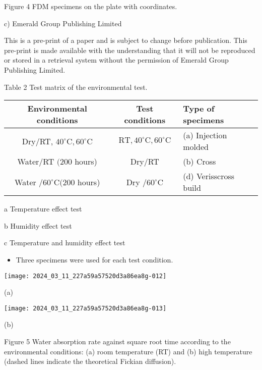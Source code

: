 \documentclass[10pt]{article}
\begin{document}
Figure 4 FDM specimens on the plate with coordinates.

c) Emerald Group Publishing Limited

This is a pre-print of a paper and is subject to change before publication. This pre-print is made available with the understanding that it will not be reproduced or stored in a retrieval system without the permission of Emerald Group Publishing Limited.

Table 2 Test matrix of the environmental test.

\begin{center}
\begin{tabular}{ccl}
\hline
Environmental conditions & Test conditions & Type of specimens \\
\hline
Dry/RT, $40^{\circ} \mathrm{C}, 60^{\circ} \mathrm{C}$ & $\mathrm{RT}, 40^{\circ} \mathrm{C}, 60^{\circ} \mathrm{C}$ & (a) Injection molded \\
\hline
Water/RT $(200$ hours) & Dry/RT & (b) Cross \\
\hline
Water $/ 60^{\circ} \mathrm{C}(200$ hours) & Dry $/ 60^{\circ} \mathrm{C}$ & (d) Verisscross build \\
\hline
\end{tabular}
\end{center}

a Temperature effect test

b Humidity effect test

c Temperature and humidity effect test

\begin{itemize}
  \item Three specimens were used for each test condition.
\end{itemize}

\begin{center}
\texttt{[image: 2024\_03\_11\_227a59a57520d3a86ea8g-012]}
\end{center}

(a)

\begin{center}
\texttt{[image: 2024\_03\_11\_227a59a57520d3a86ea8g-013]}
\end{center}

(b)

Figure 5 Water absorption rate against square root time according to the environmental conditions: (a) room temperature (RT) and (b) high temperature (dashed lines indicate the theoretical Fickian diffusion).
\end{document}
